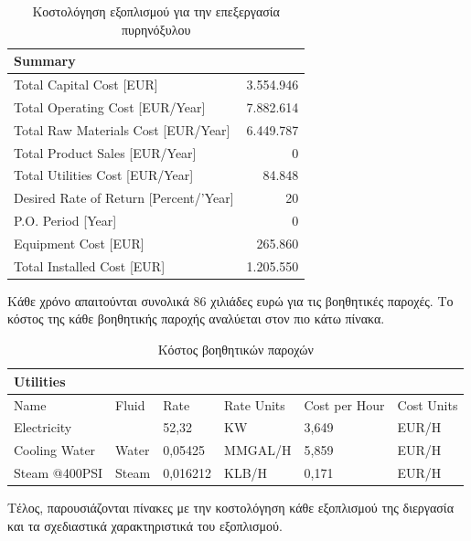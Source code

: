 \documentclass[11pt]{article}
\begin{document}
\begin{table}[htbp]
\caption{Κοστολόγηση εξοπλισμού για την επεξεργασία πυρηνόξυλου}
\centering
\begin{tabular}{lr}
Summary & \\
\hline
Total Capital Cost [EUR] & 3.554.946\\
Total Operating Cost [EUR/Year] & 7.882.614\\
Total Raw Materials Cost [EUR/Year] & 6.449.787\\
Total Product Sales [EUR/Year] & 0\\
Total Utilities Cost [EUR/Year] & 84.848\\
Desired Rate of Return [Percent/'Year] & 20\\
P.O. Period [Year] & 0\\
Equipment Cost [EUR] & 265.860\\
Total Installed Cost [EUR] & 1.205.550\\
\end{tabular}
\end{table}

Κάθε χρόνο απαιτούνται συνολικά 86 χιλιάδες ευρώ
για τις βοηθητικές παροχές. Το κόστος της κάθε βοηθητικής παροχής
αναλύεται στον πιο κάτω πίνακα.

\begin{table}[htbp]
\caption{Κόστος βοηθητικών παροχών}
\centering
\begin{tabular}{llllll}
Utilities &  &  &  &  & \\
\hline
Name & Fluid & Rate & Rate Units & Cost per Hour & Cost Units\\
Electricity &   & 52,32 & KW & 3,649 & EUR/H\\
Cooling Water & Water & 0,05425 & MMGAL/H & 5,859 & EUR/H\\
Steam @400PSI & Steam & 0,016212 & KLB/H & 0,171 & EUR/H\\
\end{tabular}
\end{table}

Τέλος, παρουσιάζονται πίνακες με την κοστολόγηση κάθε εξοπλισμού της
διεργασία και τα σχεδιαστικά χαρακτηριστικά του εξοπλισμού.
\end{document}
